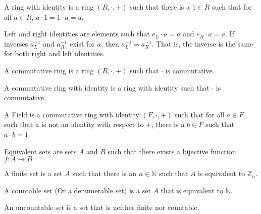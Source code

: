 \documentclass[crop=false,class=article,oneside]{standalone}
\begin{document}
        \begin{definition}
            A ring with identity is a ring $(R,\cdot,+)$
            such that there is a ${1}\in{R}$ such that for
            all ${a}\in{R}$, ${a}\cdot{1}={1}\cdot{a}=a$.
        \end{definition}
        \begin{remark}
            Left and right identities are elements such
            that ${e_{L}}\cdot{a}=a$ and ${e_{R}}\cdot{a}=a$.
            If inverses $a_{L}^{-1}$ and $a_{R}^{-1}$ exist
            for $a$, then $a_{L}^{-1}=a_{R}^{-1}$. That is,
            the inverse is the same for both right and left
            identities.
        \end{remark}
        \begin{definition}
            A commutative ring is a ring $(R,\cdot,+)$ such that
            $\cdot$ is commutative.
        \end{definition}
        \begin{definition}
            A commutative ring with identity is a
            ring with identity such that $\cdot$
            is commutative.
        \end{definition}
        \begin{definition}
            A Field is a commutative ring with identity
            $(F,\cdot,+)$
            such that for all ${a}\in{F}$ such that
            $a$ is not an identity with respect to $+$,
            there is a $b\in{F}$ such that ${a}\cdot{b}=1$.
        \end{definition}
        \begin{definition}
            Equivalent sets are sets $A$ and $B$ such that
            there exists a bijective function
            $f:{A}\rightarrow{B}$
        \end{definition}
        \begin{definition}
            A finite set is a set $A$ such that there
            is an ${n}\in{\mathbb{N}}$ such that $A$
            is equivalent to $\mathbb{Z}_{n}$.
        \end{definition}
        \begin{definition}
            A countable set (Or a denumerable set) is a
            set $A$ that is equivalent to $\mathbb{N}$.
        \end{definition}
        \begin{definition}
            An uncountable set is a set that is neither finite
            nor countable.
        \end{definition}
\end{document}
